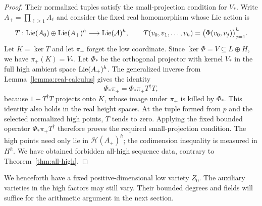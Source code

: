 \begin{proof}
Their normalized tuples satisfy the small-projection condition for
$V_*$.  Write $A_+=\prod_{\ell\ge1}A_\ell$ and consider the fixed
real homomorphism whose Lie action is
\[
 T:\operatorname{Lie}(A_0)\oplus\operatorname{Lie}(A_+)^h\longrightarrow\operatorname{Lie}(\mathcal A)^h,
 \qquad T(v_0,v_1,\ldots,v_h)
       =\bigl(\Phi(v_0,v_j)\bigr)_{j=1}^h.
\]
Let $K=\ker T$ and let $\pi_+$ forget the low coordinate.  Since
$\ker\Phi=V\subseteq L\oplus H$, we have $\pi_+(K)=V_*$.
Let $\Phi_*$ be the orthogonal projector with kernel $V_*$ in the
full high ambient space $\operatorname{Lie}(A_+)^h$.  The generalized inverse from
Lemma~\ref{lemma:real-calculus} gives the identity
\[
 \Phi_*\pi_+=\Phi_*\pi_+T^\dagger T,
\]
because $1-T^\dagger T$ projects onto $K$, whose image under
$\pi_+$ is killed by $\Phi_*$.  This identity also holds in the
real height spaces.  At the tuple formed from $p$ and the selected
normalized high points, $T$ tends to zero.  Applying the fixed bounded
operator $\Phi_*\pi_+T^\dagger$ therefore proves the required
small-projection condition.  The high points need only lie in
$\mathcal H(A_+)^h$; the codimension inequality is measured in $H^h$.
We have obtained forbidden all-high sequence data, contrary to
Theorem~\ref{thm:all-high}.
\end{proof}

We henceforth have a fixed positive-dimensional low variety $Z_0$.
The auxiliary varieties in the high factors may still vary.  Their
bounded degrees and fields will suffice for the arithmetic
argument in the next section.
